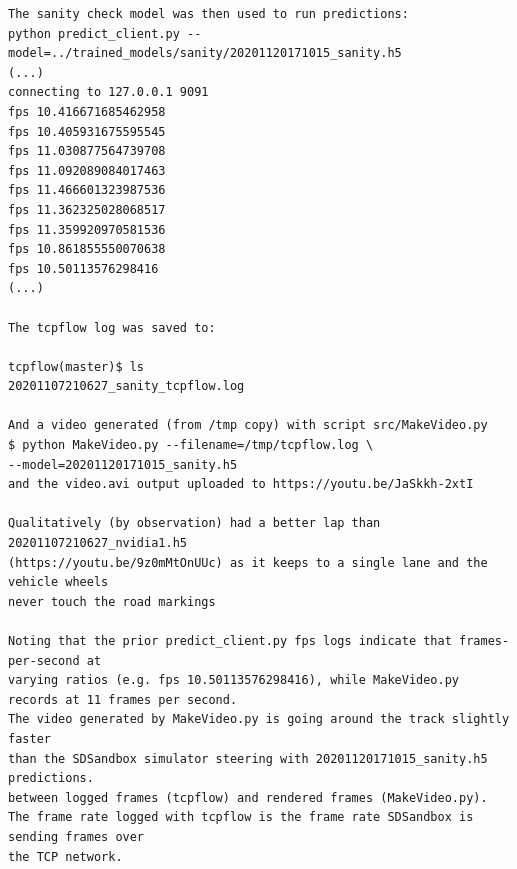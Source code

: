 \begin{verbatim}
The sanity check model was then used to run predictions:
python predict_client.py --model=../trained_models/sanity/20201120171015_sanity.h5
(...)
connecting to 127.0.0.1 9091
fps 10.416671685462958
fps 10.405931675595545
fps 11.030877564739708
fps 11.092089084017463
fps 11.466601323987536
fps 11.362325028068517
fps 11.359920970581536
fps 10.861855550070638
fps 10.50113576298416
(...)

The tcpflow log was saved to:

tcpflow(master)$ ls
20201107210627_sanity_tcpflow.log

And a video generated (from /tmp copy) with script src/MakeVideo.py
$ python MakeVideo.py --filename=/tmp/tcpflow.log \ 
--model=20201120171015_sanity.h5 
and the video.avi output uploaded to https://youtu.be/JaSkkh-2xtI

Qualitatively (by observation) had a better lap than 20201107210627_nvidia1.h5 
(https://youtu.be/9z0mMtOnUUc) as it keeps to a single lane and the vehicle wheels
never touch the road markings

Noting that the prior predict_client.py fps logs indicate that frames-per-second at
varying ratios (e.g. fps 10.50113576298416), while MakeVideo.py records at 11 frames per second.
The video generated by MakeVideo.py is going around the track slightly faster
than the SDSandbox simulator steering with 20201120171015_sanity.h5 predictions.
between logged frames (tcpflow) and rendered frames (MakeVideo.py).
The frame rate logged with tcpflow is the frame rate SDSandbox is sending frames over 
the TCP network.

\end{verbatim}

